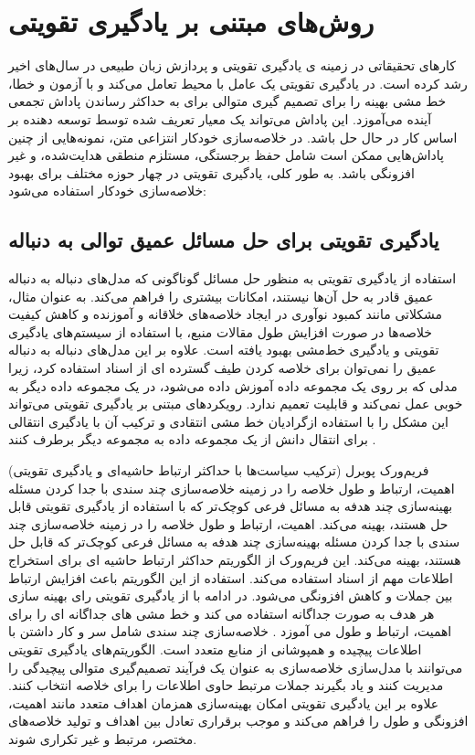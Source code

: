 \chapter{روش‌های مبتنی بر یادگیری تقویتی}

کارهای تحقیقاتی در زمینه ی یادگیری تقویتی 
و پردازش زبان طبیعی در سال‌های اخیر رشد کرده است. در یادگیری تقویتی  یک عامل با محیط تعامل می‌کند و با آزمون و خطا، خط مشی بهینه را برای تصمیم گیری متوالی برای به حداکثر رساندن پاداش تجمعی آینده می‌آموزد. این پاداش می‌تواند یک معیار تعریف شده توسط توسعه دهنده بر اساس کار در حال حل باشد. در خلاصه‌سازی خودکار انتزاعی متن، نمونه‌هایی از چنین پاداش‌هایی ممکن است شامل حفظ برجستگی، مستلزم منطقی هدایت‌شده، و غیر افزونگی باشد. به طور کلی،  یادگیری تقویتی  در چهار حوزه مختلف برای بهبود خلاصه‌سازی خودکار استفاده می‌شود:

\section{یادگیری تقویتی برای حل مسائل عمیق توالی به دنباله}

استفاده از یادگیری تقویتی به منظور حل مسائل گوناگونی که مدل‌های دنباله به دنباله عمیق قادر به حل آن‌ها نیستند، امکانات بیشتری را فراهم می‌کند. به عنوان مثال، مشکلاتی مانند کمبود نوآوری در ایجاد خلاصه‌های خلاقانه و آموزنده و کاهش کیفیت خلاصه‌ها در صورت افزایش طول مقالات منبع، با استفاده از سیستم‌های یادگیری تقویتی و یادگیری خط‌مشی		 بهبود یافته است.
 علاوه بر این  مدل‌های دنباله به دنباله عمیق را نمی‌توان برای خلاصه کردن طیف گسترده ای از اسناد استفاده کرد، زیرا مدلی که بر روی یک مجموعه داده آموزش داده می‌شود، در یک مجموعه داده دیگر به خوبی عمل نمی‌کند و قابلیت تعمیم ندارد. رویکردهای مبتنی بر یادگیری تقویتی می‌تواند این  مشکل را با استفاده ازگرادیان خط مشی انتقادی
  و ترکیب آن با یادگیری انتقالی
برای انتقال دانش از یک مجموعه داده به مجموعه دیگر برطرف کنند
\cite{DeepTL_RL}.

فریم‌ورک پوبرل
(ترکیب سیاست‌ها با حداکثر ارتباط حاشیه‌ای و یادگیری تقویتی) اهمیت، ارتباط و طول خلاصه را در زمینه خلاصه‌سازی چند سندی با جدا کردن مسئله بهینه‌سازی چند هدفه به مسائل فرعی کوچک‌تر که با استفاده از یادگیری تقویتی قابل حل هستند، بهینه می‌کند. 
اهمیت، ارتباط و طول خلاصه را در زمینه خلاصه‌سازی چند سندی با جدا کردن مسئله بهینه‌سازی چند هدفه به مسائل فرعی کوچک‌تر که قابل حل هستند، بهینه می‌کند.
این فریم‌ورک از الگوریتم حداکثر ارتباط حاشیه ای 
برای استخراج اطلاعات مهم از اسناد استفاده می‌کند. استفاده از این الگوریتم باعث افزایش ارتباط بین  جملات و کاهش افزونگی می‌شود.
در ادامه با از یادگیری تقویتی رای بهینه سازی هر هدف به صورت جداگانه استفاده می کند و خط مشی های جداگانه ای را برای اهمیت، ارتباط و طول می آموزد
\cite{PoBRL}.
خلاصه‌سازی چند سندی شامل سر و کار داشتن با اطلاعات پیچیده و همپوشانی از منابع متعدد است. الگوریتم‌های یادگیری تقویتی می‌توانند با مدل‌سازی خلاصه‌سازی به عنوان یک فرآیند تصمیم‌گیری متوالی  پیچیدگی را مدیریت کنند و یاد بگیرند جملات مرتبط حاوی اطلاعات را برای خلاصه انتخاب کنند. علاوه بر این  یادگیری تقویتی امکان بهینه‌سازی همزمان اهداف متعدد مانند اهمیت، افزونگی و طول را فراهم می‌کند و موجب برقراری تعادل بین اهداف و تولید خلاصه‌‌های مختصر، مرتبط و غیر تکراری شوند.

